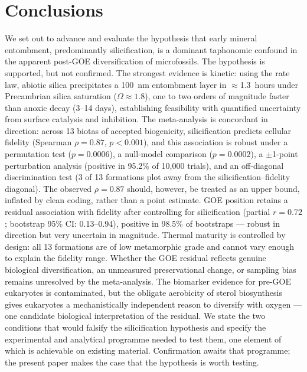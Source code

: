 \documentclass[11pt]{article}
\begin{document}
\section{Conclusions}

We set out to advance and evaluate the hypothesis that early mineral entombment, predominantly
silicification, is a dominant taphonomic confound in the apparent post-GOE diversification of
microfossils. The hypothesis is supported, but not confirmed. The strongest evidence is kinetic:
using the \citet{Rimstidt1980} rate law, abiotic silica precipitates a 100~nm entombment layer in
$\approx$1.3~hours under Precambrian silica saturation ($\Omega \approx 1.8$), one to two orders of
magnitude faster than anoxic decay (3--14 days), establishing feasibility with quantified uncertainty
from surface catalysis and inhibition. The meta-analysis is concordant in direction: across 13 biotas
of accepted biogenicity, silicification predicts cellular fidelity (Spearman $\rho = 0.87$,
$p < 0.001$), and this association is robust under a permutation test ($p = 0.0006$), a null-model
comparison ($p = 0.0002$), a $\pm$1-point perturbation analysis (positive in 95.2\% of 10{,}000
trials), and an off-diagonal discrimination test (3 of 13 formations plot away from the
silicification--fidelity diagonal). The observed $\rho = 0.87$ should, however, be treated as an upper
bound, inflated by clean coding, rather than a point estimate. GOE position retains a residual
association with fidelity after controlling for silicification (partial $r = 0.72$; bootstrap 95\% CI:
0.13--0.94), positive in 98.5\% of bootstraps --- robust in direction but very uncertain in magnitude.
Thermal maturity is controlled by design: all 13 formations are of low metamorphic grade and cannot
vary enough to explain the fidelity range. Whether the GOE residual reflects genuine biological
diversification, an unmeasured preservational change, or sampling bias remains unresolved by the
meta-analysis. The biomarker evidence for pre-GOE eukaryotes is contaminated, but the obligate
aerobicity of sterol biosynthesis gives eukaryotes a mechanistically independent reason to diversify
with oxygen --- one candidate biological interpretation of the residual. We state the two conditions
that would falsify the silicification hypothesis and specify the experimental and analytical programme
needed to test them, one element of which is achievable on existing material. Confirmation awaits
that programme; the present paper makes the case that the hypothesis is worth testing.
\end{document}

